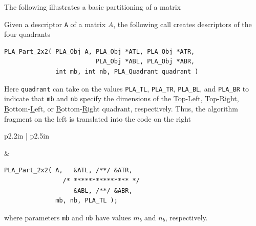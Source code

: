 The following illustrates a basic partitioning of a matrix
\renewcommand{\partitionings}{
$ 
A \rightarrow \FlaTwoByTwo{ A_{TL} }{ A_{TR} }
                          { A_{BL} }{ A_{BR} }
$
}
\renewcommand{\partitionsizes}{
$ A_{TL} $ is $ k \times k $
}
\begin{quote}
\WSpartition
\end{quote}
Given a descriptor {\tt A} of a matrix $ A $,
the following call creates descriptors of the four quadrants
\begin{FlaSpec}
\begin{verbatim}
PLA_Part_2x2( PLA_Obj A, PLA_Obj *ATL, PLA_Obj *ATR,
                         PLA_Obj *ABL, PLA_Obj *ABR,
              int mb, int nb, PLA_Quadrant quadrant )
\end{verbatim}
\end{FlaSpec}
Here {\tt quadrant} can take on the
values {\tt PLA\_TL},
{\tt PLA\_TR},
{\tt PLA\_BL},
 and {\tt PLA\_BR}
to indicate that {\tt mb} and {\tt nb}
specify the dimensions of 
the \underline{T}op-\underline{L}eft,
\underline{T}op-\underline{R}ight,
\underline{B}ottom-\underline{L}eft, or
\underline{B}ottom-\underline{R}ight 
quadrant, respectively.
Thus, the algorithm fragment on the left
is translated into the code on the right
\renewcommand{\partitionings}{
$ 
A \rightarrow \FlaTwoByTwo{ A_{TL} }{ A_{TR} }
                          { A_{BL} }{ A_{BR} }
$
}
\renewcommand{\partitionsizes}{
$ A_{TL} $ is $ m_b \times n_b $
}
\begin{center}
\begin{tabular}{p{2.2in} | p{2.5in}}
\begin{minipage}{1.9in}
\WSpartition
\end{minipage}
&
\begin{minipage}{2.5in}
\footnotesize
\begin{verbatim}
PLA_Part_2x2( A,   &ATL, /**/ &ATR,
                /* *************** */
                   &ABL, /**/ &ABR,
              mb, nb, PLA_TL );
\end{verbatim}
\end{minipage}
\end{tabular}
\end{center}
where parameters {\tt mb} and {\tt nb} have values $ m_b $ and $ n_b $,
respectively.

